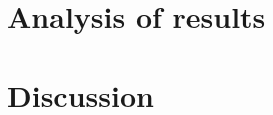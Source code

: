 \documentclass[a4paper,10pt]{report}
\begin{document}
\chapter{Analysis of results}\label{chap:analysis-results}

\chapter{Discussion}\label{chap:discussion}

\printbibliography
\end{document}
